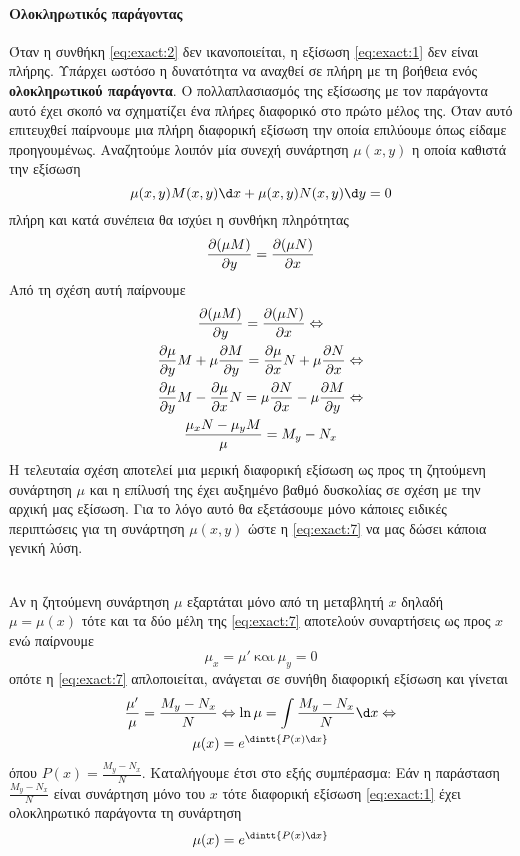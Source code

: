 \documentclass[11pt,a4paper,twoside]{book}
\begin{document}
\paragraph{Ολοκληρωτικός παράγοντας}
Όταν η συνθήκη \eqref{eq:exact:2} δεν ικανοποιείται, η εξίσωση \eqref{eq:exact:1} δεν είναι πλήρης. Υπάρχει ωστόσο η δυνατότητα να αναχθεί σε πλήρη με τη βοήθεια ενός \textbf{ολοκληρωτικού παράγοντα}. Ο πολλαπλασιασμός της εξίσωσης με τον παράγοντα αυτό έχει σκοπό να σχηματίζει ένα πλήρες διαφορικό στο πρώτο μέλος της. Όταν αυτό επιτευχθεί παίρνουμε μια πλήρη διαφορική εξίσωση την οποία επιλύουμε όπως είδαμε προηγουμένως. Αναζητούμε λοιπόν μία συνεχή συνάρτηση $\mu(x,y)$ η οποία καθιστά την εξίσωση
\begin{equation}
\mu(x,y) M(x,y)\d x+\mu(x,y)N(x,y)\d y=0
\end{equation}
πλήρη και κατά συνέπεια θα ισχύει η συνθήκη πληρότητας
\[ \diffp{(\mu M)}{y}=\diffp{(\mu N)}{x} \]
Από τη σχέση αυτή παίρνουμε
\begin{gather}
\diffp{(\mu M)}{y}=\diffp{(\mu N)}{x}\Leftrightarrow\nonumber\\
\diffp{\mu}{y}M+\mu\diffp{M}{y}=\diffp{\mu}{x}N+\mu\diffp{N}{x}\Leftrightarrow\nonumber\\
\diffp{\mu}{y}M-\diffp{\mu}{x}N=\mu\diffp{N}{x}-\mu\diffp{M}{y}\Leftrightarrow\nonumber\\
\frac{\mu_x N-\mu_y M}{\mu}=M_y-N_x\label{eq:exact:7}
\end{gather}
Η τελευταία σχέση αποτελεί μια μερική διαφορική εξίσωση ως προς τη ζητούμενη συνάρτηση $\mu$ και η επίλυσή της έχει αυξημένο βαθμό δυσκολίας σε σχέση με την αρχική μας εξίσωση. Για το λόγο αυτό θα εξετάσουμε μόνο κάποιες ειδικές περιπτώσεις για τη συνάρτηση $\mu(x,y)$ ώστε η \eqref{eq:exact:7} να μας δώσει κάποια γενική λύση.
\begin{bAlist}
\item {}\\
Αν η ζητούμενη συνάρτηση $\mu$ εξαρτάται μόνο από τη μεταβλητή $x$ δηλαδή $\mu=\mu(x)$ τότε και τα δύο μέλη της \eqref{eq:exact:7} αποτελούν συναρτήσεις ως προς $x$ ενώ παίρνουμε
\[ \mu_x=\mu'\ \textrm{και}\ \mu_y=0 \]
οπότε η \eqref{eq:exact:7} απλοποιείται, ανάγεται σε συνήθη διαφορική εξίσωση και γίνεται
\begin{gather*}
\frac{\mu'}{\mu}=\frac{M_y-N_x}{N}\Leftrightarrow
\ln{\mu}=\int{\frac{M_y-N_x}{N}\d x}\Leftrightarrow\\
\mu(x)=e^{\dintt{P(x)\d x}}
\end{gather*}
όπου $P(x)=\frac{M_y-N_x}{N}$. Καταλήγουμε έτσι στο εξής συμπέρασμα: Εάν η παράσταση $\frac{M_y-N_x}{N}$ είναι συνάρτηση μόνο του $x$ τότε διαφορική εξίσωση \eqref{eq:exact:1} έχει ολοκληρωτικό παράγοντα τη συνάρτηση
\begin{equation}
\mu(x)=e^{\dintt{P(x)\d x}}
\end{equation}
\end{bAlist}
\end{document}
